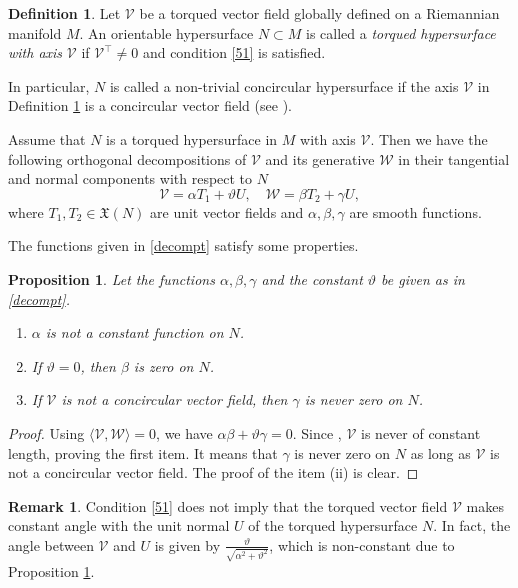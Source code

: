 \documentclass[12pt]{amsart}
\def\v{\mathcal V}
\def\w{\mathcal W}
\newtheorem{proposition}[theorem]{Proposition}
\theoremstyle{definition}
\newtheorem{definition}[theorem]{Definition}
\newtheorem{remark}[theorem]{Remark}
\begin{document}
\begin{definition}\label{def5}
Let $\v$ be a torqued vector field globally defined on a Riemannian manifold $M$. An orientable hypersurface $N\subset M$ is called a {\it torqued hypersurface with axis} $\v$ if $\v^{\top} \neq 0$ and condition \eqref{51} is satisfied. 
\end{definition}

In particular, $N$ is called a non-trivial concircular hypersurface if the axis $\v$ in Definition \ref{def5} is a concircular vector field (see  \cite{loy4}). 

Assume that $N$ is a torqued hypersurface in $M$ with axis $\v$. Then we have the following orthogonal decompositions of $\v$ and its generative $\w$ in their tangential and normal components with respect to $N$
\begin{equation}\label{decompt}
\v=\alpha T_1  +\vartheta U, \quad \w=\beta T_2 +\gamma U,
\end{equation}
where $T_1,T_2 \in \mathfrak{X}(N)$ are unit vector fields and $\alpha,\beta,\gamma$ are smooth functions.

The functions given in \eqref{decompt} satisfy some properties.

\begin{proposition} \label{abg}
Let the functions $\alpha,\beta,\gamma$ and the constant $\vartheta$ be given as in \eqref{decompt}.
\begin{enumerate}
\item[(i)] $\alpha$ is not a constant function on $N$. 
\item[(ii)] If $\vartheta=0$, then $\beta$ is zero on $N$.
\item[(iii)] If $\v$ is not a concircular vector field, then $\gamma$ is never zero on $N$.
\end{enumerate}
\end{proposition}
\begin{proof}
Using $\langle \v,\w \rangle=0$, we have $\alpha\beta +\vartheta \gamma=0$. Since \cite[Proposition 3.2]{amc}, $\v$ is never of constant length, proving the first item. It means that $\gamma$ is never zero on $N$ as long as $\v$ is not a concircular vector field. The proof of the item (ii) is clear.
\end{proof}

\begin{remark}
Condition \eqref{51} does not imply that the torqued vector field $\v$ makes constant angle with the unit normal $U$ of the torqued hypersurface $N$. In fact, the angle between $\v$ and $U$ is given by $\frac{\vartheta}{\sqrt{\alpha^2+\vartheta^2}}$, which is non-constant due to Proposition \ref{abg}.
\end{remark}
\end{document}
